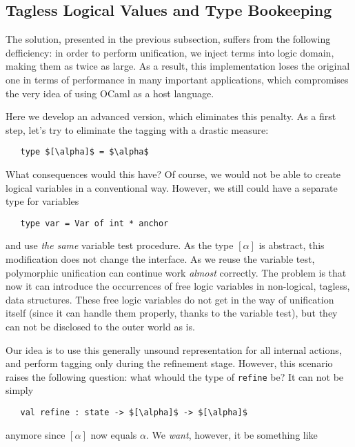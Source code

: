 \subsection{Tagless Logical Values and Type Bookeeping}

The solution, presented in the previous subsection, suffers from the following defficiency: in order to perform unification,
we inject terms into logic domain, making them as twice as large. As a result, this implementation loses the original one in 
terms of performance in many important applications, which compromises the very idea of using OCaml as a host language.

Here we develop an advanced version, which eliminates this penalty. As a first step, let's try to eliminate the tagging with
a drastic measure:

\begin{lstlisting}
   type $[\alpha]$ = $\alpha$
\end{lstlisting}

What consequences would this have? Of course, we would not be able to create logical variables in a conventional way. However, 
we still could have a separate type for variables

\begin{lstlisting}
   type var = Var of int * anchor
\end{lstlisting}

and use \emph{the same} variable test procedure. As the type $[\alpha]$ is abstract, this modification does not change the interface. 
As we reuse the variable test, polymorphic unification can continue work \emph{almost} correctly. The problem is that
now it can introduce the occurrences of free logic variables in non-logical, tagless, data structures. These free logic variables 
do not get in the way of unification itself (since it can handle them properly, thanks to the variable test), but they can not
be disclosed to the outer world as is.

Our idea is to use this generally unsound representation for all internal actions, and perform tagging only during the refinement
stage. However, this scenario raises the following question: what whould the type of \lstinline{refine} be? It can not be simply

\begin{lstlisting}
   val refine : state -> $[\alpha]$ -> $[\alpha]$
\end{lstlisting}

anymore since $[\alpha]$ now equals $\alpha$. We \emph{want}, however, it be something like

